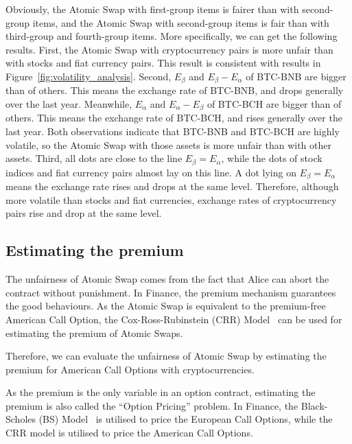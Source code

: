 Obviously, the Atomic Swap with first-group items is fairer than with second-group items, and the Atomic Swap with second-group items is fair than with third-group and fourth-group items.
More specifically, we can get the following results.
First, the Atomic Swap with cryptocurrency pairs is more unfair than with stocks and fiat currency pairs.
This result is consistent with results in Figure~\ref{fig:volatility_analysis}.
Second, $E_\beta$ and $E_\beta - E_\alpha$ of BTC-BNB are bigger than of others. This means the exchange rate of BTC-BNB, and drops generally over the last year.
Meanwhile, $E_\alpha$ and $E_\alpha - E_\beta$ of BTC-BCH are bigger than of others. This means the exchange rate of BTC-BCH, and rises generally over the last year.
Both observations indicate that BTC-BNB and BTC-BCH are highly volatile, so the Atomic Swap with those assets is more unfair than with other assets.
Third, all dots are close to the line $E_\beta = E_\alpha$, while the dots of stock indices and fiat currency pairs almost lay on this line.
A dot lying on $E_\beta = E_\alpha$ means the exchange rate rises and drops at the same level.
Therefore, although more volatile than stocks and fiat currencies, exchange rates of cryptocurrency pairs rise and drop at the same level.
















\subsection{Estimating the premium}

The unfairness of Atomic Swap comes from the fact that Alice can abort the contract without punishment.
In Finance, the premium mechanism guarantees the good behaviours.
As the Atomic Swap is equivalent to the premium-free American Call Option, the Cox-Ross-Rubinstein (CRR) Model~\cite{cox1979option} can be used for estimating the premium of Atomic Swaps.

Therefore, we can evaluate the unfairness of Atomic Swap by estimating the premium for American Call Options with cryptocurrencies.

As the premium is the only variable in an option contract, estimating the premium is also called the ``Option Pricing'' problem.
In Finance, the Black-Scholes (BS) Model~\cite{black1973pricing} is utilised to price the European Call Options,
while the CRR model is utilised to price the American Call Options.

